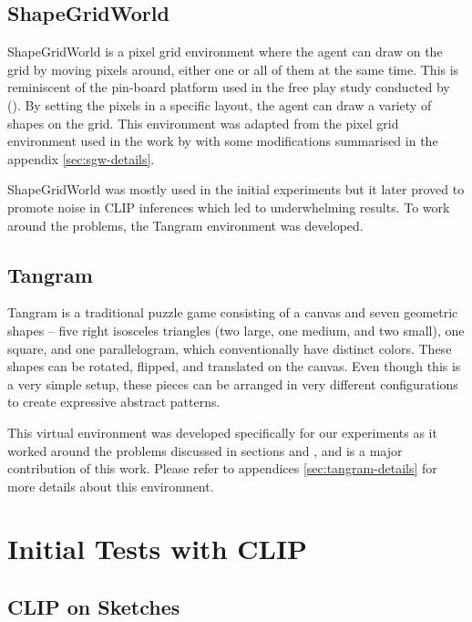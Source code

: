 \subsection{ShapeGridWorld}
\label{sec:sgw}
ShapeGridWorld is a pixel grid environment where the agent can draw on the grid by moving pixels around, either one or all of them at the same time.
This is reminiscent of the pin-board platform used in the free play study conducted by \citet{diggs} ().
By setting the pixels in a specific layout, the agent can draw a variety of shapes on the grid.
This environment was adapted from the pixel grid environment used in the work by \citet{rair} with some modifications summarised in the appendix \ref{sec:sgw-details}.

ShapeGridWorld was mostly used in the initial experiments but it later proved to promote noise in CLIP inferences which led to underwhelming results.
To work around the problems, the Tangram environment was developed.

\subsection{Tangram}
\label{sec:tangram}
Tangram is a traditional puzzle game consisting of a canvas and seven geometric shapes -- five right isosceles triangles (two large, one medium, and two small), one square, and one parallelogram, which conventionally have distinct colors.
These shapes can be rotated, flipped, and translated on the canvas.
Even though this is a very simple setup, these pieces can be arranged in very different configurations to create expressive abstract patterns.

This virtual environment was developed specifically for our experiments as it worked around the problems discussed in sections  and , and is a major contribution of this work.
Please refer to appendices \ref{sec:tangram-details} for more details about this environment.

\section{Initial Tests with CLIP}
\label{sec:clip-custom}


\subsection{CLIP on Sketches}
\label{sec:clip-sketches}


